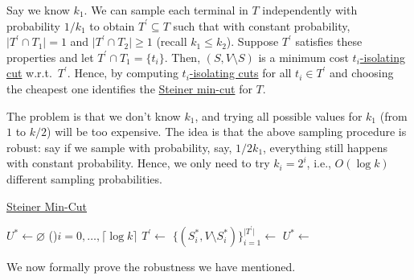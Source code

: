 Say we know \(k_1\). We can sample each terminal in \(T\) independently with probability \(1 / k_1\) to obtain \(T^{\prime} \subseteq T\) such that with constant probability, \(\lvert T^{\prime} \cap T_1 \rvert = 1\) and \(\lvert T^{\prime} \cap T_2 \rvert \geq 1\) (recall \(k_1 \leq k_2\)). Suppose \(T^{\prime} \) satisfies these properties and let \(T^{\prime} \cap T_1 = \{ t_i \} \). Then, \((S, V\setminus S)\) is a minimum cost \hyperref[prb:isolating-cut]{\(t_i\)-isolating cut} w.r.t.\ \(T^{\prime} \). Hence, by computing \hyperref[prb:isolating-cut]{\(t_i\)-isolating cuts} for all \(t_i \in T^{\prime} \) and choosing the cheapest one identifies the \hyperref[prb:Steiner-min-cut]{Steiner min-cut} for \(T\).

The problem is that we don't know \(k_1\), and trying all possible values for \(k_1\) (from \(1\) to \(k / 2\)) will be too expensive. The idea is that the above sampling procedure is robust: say if we sample with probability, say, \(1 / 2k_1\), everything still happens with constant probability. Hence, we only need to try \(k_i = 2^i\), i.e., \(O(\log k)\) different sampling probabilities.

\begin{algorithm}[H]\label{algo:Steiner-min-cut}
	\DontPrintSemicolon{}
	\caption{\hyperref[prb:Steiner-min-cut]{Steiner Min-Cut}}
	\BlankLine

	\(U^{\ast} \gets \varnothing \)
	\For(){\(i = 0, \dots , \lceil \log k \rceil \)}{
	\(T^{\prime} \gets\)
	\(\{ (S_i^{\ast} , V\setminus S_i^{\ast} ) \}_{i=1}^{\lvert T^{\prime} \rvert } \gets\)\;
	\(U^{\ast} \gets \)
	}
	\;
\end{algorithm}

We now formally prove the robustness we have mentioned.

